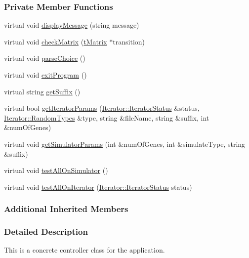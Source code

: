 \subsubsection*{Private Member Functions}
\begin{DoxyCompactItemize}
\item 
virtual void \hyperlink{class_menu_a616bae73f48b58a1b5629354826c30cc}{display\+Message} (string message)
\item 
virtual void \hyperlink{class_menu_a3fbf0f02d6875bc41c4ee42597d99ff1}{check\+Matrix} (\hyperlink{classt_matrix}{t\+Matrix} $\ast$transition)
\item 
virtual void \hyperlink{class_menu_aad01d0f840a8be08e301d24d17b00b96}{parse\+Choice} ()
\item 
virtual void \hyperlink{class_menu_afd50901663e9f9b1210ba9ef7512c02d}{exit\+Program} ()
\item 
virtual string \hyperlink{class_menu_ab5b08e13a2db9ae41ac9e9696473a143}{get\+Suffix} ()
\item 
virtual bool \hyperlink{class_menu_ac759d0525a0736f421e8dfd443b1177c}{get\+Iterator\+Params} (\hyperlink{class_iterator_a1eb24c519953c2a333ea4a345b0c679c}{Iterator\+::\+Iterator\+Status} \&status, \hyperlink{class_iterator_a68bc1c5e7ad39ed78690beaa8a607430}{Iterator\+::\+Random\+Types} \&type, string \&file\+Name, string \&suffix, int \&num\+Of\+Genes)
\item 
virtual void \hyperlink{class_menu_a893fd3c7d9e4bc5e32d4e2e20d8da804}{get\+Simulator\+Params} (int \&num\+Of\+Genes, int \&simulate\+Type, string \&suffix)
\item 
virtual void \hyperlink{class_menu_a27538c5e2650251e98ed91257b0a2ba8}{test\+All\+On\+Simulator} ()
\item 
virtual void \hyperlink{class_menu_a4ff4dfbd63a558ed2a6aa79fbde05eba}{test\+All\+On\+Iterator} (\hyperlink{class_iterator_a1eb24c519953c2a333ea4a345b0c679c}{Iterator\+::\+Iterator\+Status} status)
\end{DoxyCompactItemize}
\subsubsection*{Additional Inherited Members}


\subsubsection{Detailed Description}
This is a concrete controller class for the application. 

